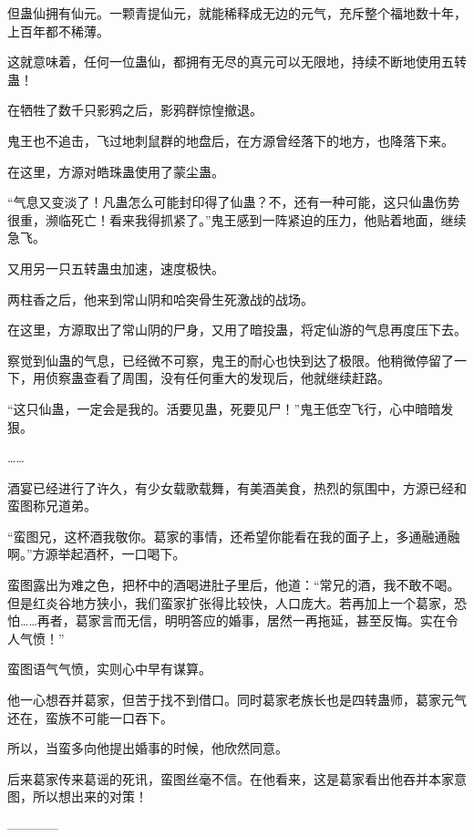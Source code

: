 \begin{this_body}
但蛊仙拥有仙元。一颗青提仙元，就能稀释成无边的元气，充斥整个福地数十年，上百年都不稀薄。

这就意味着，任何一位蛊仙，都拥有无尽的真元可以无限地，持续不断地使用五转蛊！

在牺牲了数千只影鸦之后，影鸦群惊惶撤退。

鬼王也不追击，飞过地刺鼠群的地盘后，在方源曾经落下的地方，也降落下来。

在这里，方源对皓珠蛊使用了蒙尘蛊。

“气息又变淡了！凡蛊怎么可能封印得了仙蛊？不，还有一种可能，这只仙蛊伤势很重，濒临死亡！看来我得抓紧了。”鬼王感到一阵紧迫的压力，他贴着地面，继续急飞。

又用另一只五转蛊虫加速，速度极快。

两柱香之后，他来到常山阴和哈突骨生死激战的战场。

在这里，方源取出了常山阴的尸身，又用了暗投蛊，将定仙游的气息再度压下去。

察觉到仙蛊的气息，已经微不可察，鬼王的耐心也快到达了极限。他稍微停留了一下，用侦察蛊查看了周围，没有任何重大的发现后，他就继续赶路。

“这只仙蛊，一定会是我的。活要见蛊，死要见尸！”鬼王低空飞行，心中暗暗发狠。

……

酒宴已经进行了许久，有少女载歌载舞，有美酒美食，热烈的氛围中，方源已经和蛮图称兄道弟。

“蛮图兄，这杯酒我敬你。葛家的事情，还希望你能看在我的面子上，多通融通融啊。”方源举起酒杯，一口喝下。

蛮图露出为难之色，把杯中的酒喝进肚子里后，他道：“常兄的酒，我不敢不喝。但是红炎谷地方狭小，我们蛮家扩张得比较快，人口庞大。若再加上一个葛家，恐怕……再者，葛家言而无信，明明答应的婚事，居然一再拖延，甚至反悔。实在令人气愤！”

蛮图语气气愤，实则心中早有谋算。

他一心想吞并葛家，但苦于找不到借口。同时葛家老族长也是四转蛊师，葛家元气还在，蛮族不可能一口吞下。

所以，当蛮多向他提出婚事的时候，他欣然同意。

后来葛家传来葛谣的死讯，蛮图丝毫不信。在他看来，这是葛家看出他吞并本家意图，所以想出来的对策！

------------

\end{this_body}

